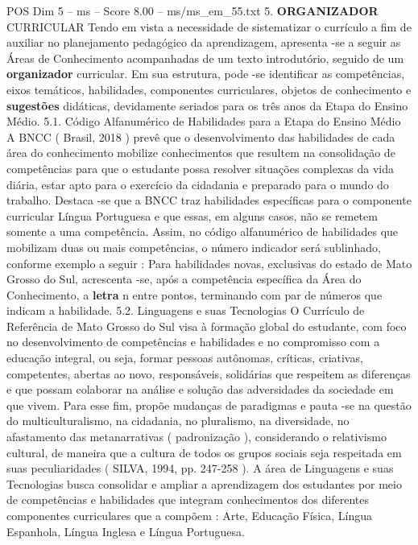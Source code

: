 \begin{textsample}{POS Dim 5 – ms – Score 8.00 – ms/ms\_em\_55.txt}  \label{ex:f5_pos_211}
5. \textbf{ORGANIZADOR} CURRICULAR Tendo em vista a necessidade de sistematizar o currículo a fim de auxiliar no planejamento pedagógico da aprendizagem, apresenta -se a seguir as Áreas de Conhecimento acompanhadas de um texto introdutório, seguido de um \textbf{organizador} curricular.
Em sua estrutura, pode -se identificar as competências, eixos temáticos, habilidades, componentes curriculares, objetos de conhecimento e \textbf{sugestões} didáticas, devidamente seriados para os três anos da Etapa do Ensino Médio. 5.1.
Código Alfanumérico de Habilidades para a Etapa do Ensino Médio A BNCC ( Brasil, 2018 ) prevê que o desenvolvimento das habilidades de cada área do conhecimento mobilize conhecimentos que resultem na consolidação de competências para que o estudante possa resolver situações complexas da vida diária, estar apto para o exercício da cidadania e preparado para o mundo do trabalho.
Destaca -se que a BNCC traz habilidades específicas para o componente curricular Língua Portuguesa e que essas, em alguns casos, não se remetem somente a uma competência.
Assim, no código alfanumérico de habilidades que mobilizam duas ou mais competências, o número indicador será sublinhado, conforme exemplo a seguir : Para habilidades novas, exclusivas do estado de Mato Grosso do Sul, acrescenta -se, após a competência específica da Área do Conhecimento, a \textbf{letra} n entre pontos, terminando com par de números que indicam a habilidade. 5.2.
Linguagens e suas Tecnologias O Currículo de Referência de Mato Grosso do Sul visa à formação global do estudante, com foco no desenvolvimento de competências e habilidades e no compromisso com a educação integral, ou seja, formar pessoas autônomas, críticas, criativas, competentes, abertas ao novo, responsáveis, solidárias que respeitem as diferenças e que possam colaborar na análise e solução das adversidades da sociedade em que vivem.
Para esse fim, propõe mudanças de paradigmas e pauta -se na questão do multiculturalismo, na cidadania, no pluralismo, na diversidade, no afastamento das metanarrativas ( padronização ), considerando o relativismo cultural, de maneira que a cultura de todos os grupos sociais seja respeitada em suas peculiaridades ( SILVA, 1994, pp. 247-258 ).
A área de Linguagens e suas Tecnologias busca consolidar e ampliar a aprendizagem dos estudantes por meio de competências e habilidades que integram conhecimentos dos diferentes componentes curriculares que a compõem : Arte, Educação Física, Língua Espanhola, Língua Inglesa e Língua Portuguesa.

\end{textsample}
